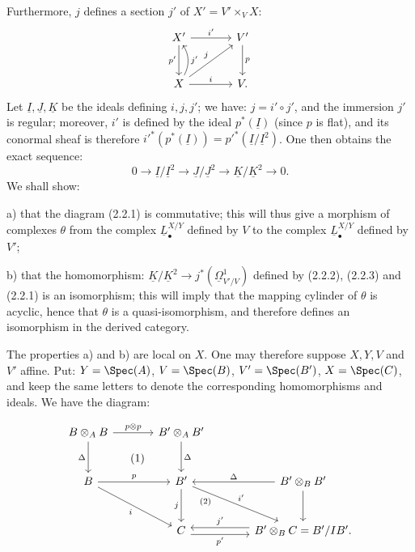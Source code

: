 %
Furthermore,
$j$ defines a section $j'$ of $X'=V'\times_V X$:
\[
\begin{tikzcd}[column sep=large,row sep=large]
X' \arrow[r,"i'"] \arrow[d,"p'"'] & V' \arrow[d,"p"]\\
X \arrow[r,"i"] \arrow[ur,"j"] \arrow[u,"j'"',bend right] & V .
\end{tikzcd}
\]
Let $\underline{I},\underline{J},\underline{K}$ be the ideals defining $i,j,j'$; we have: $j=i'\circ j'$, and the immersion $j'$ is regular; moreover, $i'$ is defined by the ideal $p^*(\underline{I})$ (since $p$ is flat), and its conormal sheaf is therefore $i'^*(p^*(\underline{I}))=p'^*(\underline{I}/\underline{I}^2)$. One then obtains the exact sequence:
\begin{equation}\tag{2.2.3}
0\longrightarrow \underline{I}/\underline{I}^2\longrightarrow \underline{J}/\underline{J}^2\longrightarrow \underline{K}/\underline{K}^2\longrightarrow0.
\end{equation}
We shall show:

a) that the diagram (2.2.1) is commutative; this will thus give a morphism of complexes $\theta$ from the complex $\underline{L}^{X/Y}_\bullet$ defined by $V$ to the complex $\underline{L}^{X/Y}_\bullet$ defined by $V'$;

b) that the homomorphism: $\underline{K}/\underline{K}^2\longrightarrow j^*(\underline{\Omega}^1_{V'/V})$ defined by (2.2.2), (2.2.3) and (2.2.1) is an isomorphism; this will imply that the mapping cylinder of $\theta$ is acyclic, hence that $\theta$ is a quasi-isomorphism, and therefore defines an isomorphism in the derived category.

The properties a) and b) are local on $X$. One may therefore suppose $X,Y,V$ and $V'$ affine. Put: $Y=\Spec(A)$, $V=\Spec(B)$, $V'=\Spec(B')$, $X=\Spec(C)$, and keep the same letters to denote the corresponding homomorphisms and ideals. We have the diagram:

%
\[
\begin{tikzcd}[column sep=large,row sep=large]
B\otimes_A B \arrow[r,"p\otimes p"] \arrow[d,"\Delta"'] \arrow[dr,phantom,"(1)"] & B'\otimes_A B' \arrow[d,"\Delta"]\\
B \arrow[r,"p"] \arrow[dr,"i"'] & B' \arrow[d,"j"'] \arrow[dr,"i'","(2)"' near start] & B'\otimes_B B' \arrow[l,"\Delta"'] \arrow[d]\\
{} & C \arrow[r,shift right=.7ex,"p'"'] & B'\otimes_B C = B'/IB'. \arrow[l,shift right=.7ex,"j'"']
\end{tikzcd}
\]

